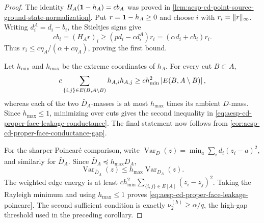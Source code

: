 \begin{proof}
The identity \(H_A(\mathbf{1}-h_A)=cb_A\) was proved in
\cref{lem:aesp-cd-point-source-ground-state-normalization}.  Put
\(r=\mathbf{1}-h_A\geq0\) and choose \(i\) with \(r_i=\lVert r\rVert_\infty\).
Writing \(d_i^A=d_i-b_i\), the Stieltjes signs give
\begin{equation*}
 c b_i=(H_Ar)_i
 \geq(p d_i-cd_i^A)r_i
 =(\alpha d_i+cb_i)r_i.
\end{equation*}
Thus
\(r_i\leq c\eta_A/(\alpha+c\eta_A)\), proving the first bound.

Let \(h_{\min}\) and \(h_{\max}\) be the extreme coordinates of \(h_A\).
For every cut \(B\subset A\),
\begin{equation*}
 c\sum_{\{i,j\}\in E(B,A\setminus B)}h_{A,i}h_{A,j}
 \geq c h_{\min}^2\left\lvert E(B,A\setminus B) \right\rvert,
\end{equation*}
whereas each of the two \(\bar D_A\)-masses is at most \(h_{\max}\)
times its ambient \(D\)-mass.  Since \(h_{\max}\leq1\), minimizing over
cuts gives the second inequality in
\cref{eq:aesp-cd-proper-face-leakage-conductance}.  The final statement now
follows from \cref{cor:aesp-cd-proper-face-conductance-gap}.

For the sharper Poincar\'e comparison, write
\(\operatorname{Var}_D(z)=\min_a\sum_i d_i(z_i-a)^2\), and similarly for
\(\bar D_A\).  Since \(\bar D_A\preceq h_{\max}D_A\),
\begin{equation*}
 \operatorname{Var}_{\bar D_A}(z)
 \leq h_{\max}\operatorname{Var}_{D_A}(z).
\end{equation*}
The weighted edge energy is at least
\(c h_{\min}^2\sum_{\{i,j\}\in E[A]}(z_i-z_j)^2\).  Taking the Rayleigh
minimum and using \(h_{\max}\leq1\) proves
\cref{eq:aesp-cd-proper-face-leakage-poincare}.  The second sufficient
condition is exactly \(\nu_2^{(h)}\geq\alpha/q\), the high-gap threshold
used in the preceding corollary.
\end{proof}

